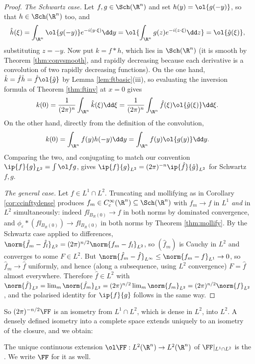 \begin{proof}
	\emph{The Schwartz case.} Let $f, g \in \Sch(\R^n)$ and set $h(y) = \ol{g(-y)}$, so that $h \in \Sch(\R^n)$ too, and
	$$\hat h(\xi)=\int_{\R^n}\ol{g(-y)}e^{-i(y\cdot\xi)}\dd y = \ol{\int_{\R^n}g(z)e^{-i(z\cdot\xi)}\dd z}=\ol{\hat g(\xi)},$$
	substituting $z = -y$. Now put $k = f * h$, which lies in $\Sch(\R^n)$ (it is smooth by Theorem \ref{thm:convsmooth}, and rapidly decreasing because each derivative is a convolution of two rapidly decreasing functions). On the one hand, $\hat k = \hat f\hat h = \hat f \ol{\hat g}$ by Lemma \ref{lem:ftbasic}(iii), so evaluating the inversion formula of Theorem \ref{thm:ftinv} at $x = 0$ gives
	$$k(0) = \frac{1}{(2\pi)^n}\int_{\R^n}\hat k(\xi)\dd\xi = \frac{1}{(2\pi)^n}\int_{\R^n}\hat f(\xi)\ol{\hat g(\xi)}\dd\xi.$$
	On the other hand, directly from the definition of the convolution,
	$$k(0)=\int_{\R^n}f(y)h(-y)\dd y = \int_{\R^n}f(y)\ol{g(y)}\dd y.$$
	Comparing the two, and conjugating to match our convention $\ip{f}{g}_{L^2}=\int\ol fg$, gives $\ip{f}{g}_{L^2}=(2\pi)^{-n}\ip{\hat f}{\hat g}_{L^2}$ for Schwartz $f, g$.

	\emph{The general case.} Let $f \in L^1 \cap L^2$. Truncating and mollifying as in Corollary \ref{cor:ccinftydense} produces $f_m \in C_c^\infty(\R^n)\subseteq\Sch(\R^n)$ with $f_m \to f$ in $L^1$ \emph{and} in $L^2$ simultaneously: indeed $f\ii_{B_R(0)}\to f$ in both norms by dominated convergence, and $\phi_\varepsilon * (f \ii_{B_R(0)})\to f\ii_{B_R(0)}$ in both norms by Theorem \ref{thm:mollify}. By the Schwartz case applied to differences, $\norm{\hat f_m - \hat f_l}_{L^2}=(2\pi)^{n/2}\norm{f_m-f_l}_{L^2}$, so $(\hat f_m)$ is Cauchy in $L^2$ and converges to some $F \in L^2$. But $\norm{\hat f_m - \hat f}_{L^\infty}\le\norm{f_m-f}_{L^1}\to 0$, so $\hat f_m \to \hat f$ uniformly, and hence (along a subsequence, using $L^2$ convergence) $F = \hat f$ almost everywhere. Therefore $\hat f \in L^2$ with $\norm{\hat f}_{L^2}=\lim_m\norm{\hat f_m}_{L^2}=(2\pi)^{n/2}\lim_m\norm{f_m}_{L^2}=(2\pi)^{n/2}\norm{f}_{L^2}$, and the polarised identity for $\ip{f}{g}$ follows in the same way.
\end{proof}

So $(2\pi)^{-n/2}\FF$ is an isometry from $L^1 \cap L^2$, which is dense in $L^2$, into $L^2$. A densely defined isometry into a complete space extends uniquely to an isometry of the closure, and we obtain:

\begin{definition}
	The unique continuous extension $\ol\FF : L^2(\R^n)\to L^2(\R^n)$ of $\FF|_{L^1 \cap L^2}$ is the . We write $\FF$ for it as well.
\end{definition}

